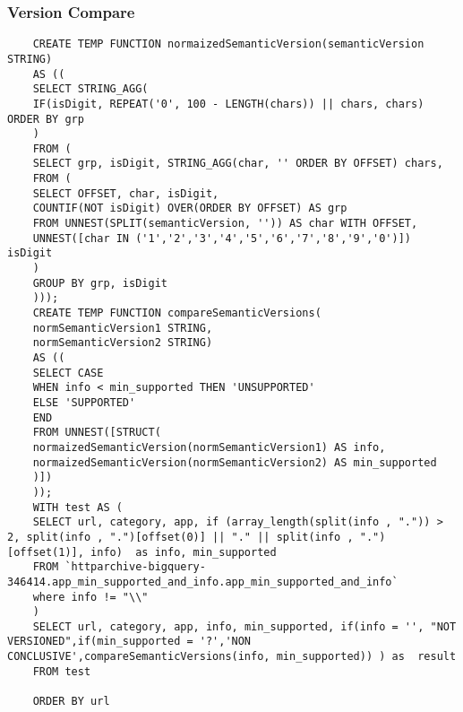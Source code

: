 \subsubsection{Version Compare}
\begin{lstlisting}
	CREATE TEMP FUNCTION normaizedSemanticVersion(semanticVersion STRING) 
	AS ((
	SELECT STRING_AGG(
	IF(isDigit, REPEAT('0', 100 - LENGTH(chars)) || chars, chars) ORDER BY grp 
	)
	FROM (
	SELECT grp, isDigit, STRING_AGG(char, '' ORDER BY OFFSET) chars,
	FROM (
	SELECT OFFSET, char, isDigit,
	COUNTIF(NOT isDigit) OVER(ORDER BY OFFSET) AS grp
	FROM UNNEST(SPLIT(semanticVersion, '')) AS char WITH OFFSET, 
	UNNEST([char IN ('1','2','3','4','5','6','7','8','9','0')]) isDigit
	)
	GROUP BY grp, isDigit
	)));
	CREATE TEMP FUNCTION compareSemanticVersions(
	normSemanticVersion1 STRING, 
	normSemanticVersion2 STRING) 
	AS ((
	SELECT CASE 
	WHEN info < min_supported THEN 'UNSUPPORTED'
	ELSE 'SUPPORTED'
	END
	FROM UNNEST([STRUCT(
	normaizedSemanticVersion(normSemanticVersion1) AS info, 
	normaizedSemanticVersion(normSemanticVersion2) AS min_supported
	)])
	));
	WITH test AS (
	SELECT url, category, app, if (array_length(split(info , ".")) > 2, split(info , ".")[offset(0)] || "." || split(info , ".")[offset(1)], info)  as info, min_supported	
	FROM `httparchive-bigquery-346414.app_min_supported_and_info.app_min_supported_and_info`
	where info != "\\"
	)
	SELECT url, category, app, info, min_supported, if(info = '', "NOT VERSIONED",if(min_supported = '?','NON CONCLUSIVE',compareSemanticVersions(info, min_supported)) ) as  result
	FROM test 
	
	ORDER BY url
\end{lstlisting}

